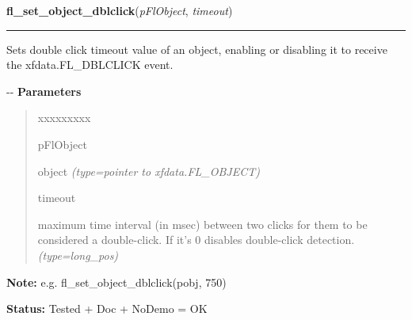     \label{xformslib:flbasic:fl_set_object_dblclick}

    \vspace{0.5ex}

\hspace{.8\funcindent}\begin{boxedminipage}{\funcwidth}

    \raggedright \textbf{fl\_set\_object\_dblclick}(\textit{pFlObject}, \textit{timeout})

    \vspace{-1.5ex}

    \rule{\textwidth}{0.5\fboxrule}
\setlength{\parskip}{2ex}

Sets double click timeout value of an object, enabling or disabling it
to receive the xfdata.FL\_DBLCLICK event.

-{}-
\setlength{\parskip}{1ex}
      \textbf{Parameters}
      \vspace{-1ex}

      \begin{quote}
        \begin{Ventry}{xxxxxxxxx}

          \item[pFlObject]


object
            {\it (type=pointer to xfdata.FL\_OBJECT)}

          \item[timeout]


maximum time interval (in msec) between two clicks for them to be
considered a double-click. If it's 0 disables double-click detection.
            {\it (type=long\_pos)}

        \end{Ventry}

      \end{quote}

\textbf{Note:} 
e.g. fl\_set\_object\_dblclick(pobj, 750)


\textbf{Status:} 
Tested + Doc + NoDemo = OK


    \end{boxedminipage}

    \label{xformslib:flbasic:fl_get_object_dblclick}

    \vspace{0.5ex}

